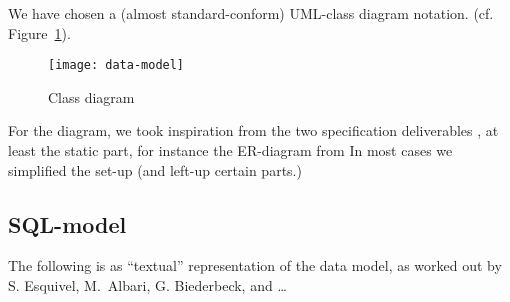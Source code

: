 





We have chosen a (almost standard-conform) UML-class diagram notation.
(cf. Figure~\ref{fig:classdiagram}).


\begin{figure}[htbp]
  \centering
  \texttt{[image: data-model]}
  \caption{Class diagram}
  \label{fig:classdiagram}
\end{figure}

For the diagram, we took inspiration from the two specification
deliverables \cite{coma:spec1} \cite{coma:spec2}, at least the static part,
for instance the ER-diagram from \cite{coma:spec1} In most cases we
simplified the set-up (and left-up certain parts.)





\subsection{SQL-model}
\label{sec:datamodel.sql}
%

The following is as ``textual'' representation of the data model, as worked
out by S. Esquivel, M.\ Albari, G. Biederbeck, and \ldots





\newpage









%


%

